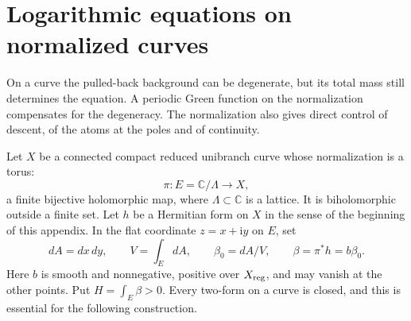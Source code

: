 \section{Logarithmic equations on normalized curves}
\label{sec:unibranch-curve-equations}

On a curve the pulled-back background can be degenerate, but its total mass still determines the equation. A periodic Green function on the normalization compensates for the degeneracy. The normalization also gives direct control of descent, of the atoms at the poles and of continuity.

Let $X$ be a connected compact reduced unibranch curve whose normalization is a torus:
\[
 \pi:E=\mathbb C/\Lambda\longrightarrow X,
\]
a finite bijective holomorphic map, where $\Lambda\subset\mathbb C$ is a lattice. It is biholomorphic outside a finite set. Let $h$ be a Hermitian form on $X$ in the sense of the beginning of this appendix. In the flat coordinate $z=x+\mathrm iy$ on $E$, set
\[
 dA=dx\,dy,\qquad V=\int_EdA,\qquad
 \beta_0=dA/V,\qquad \beta=\pi^*h=b\beta_0.
\]
Here $b$ is smooth and nonnegative, positive over $X_{\rm reg}$, and may vanish at the other points. Put $H=\int_E\beta>0$. Every two-form on a curve is closed, and this is essential for the following construction.

